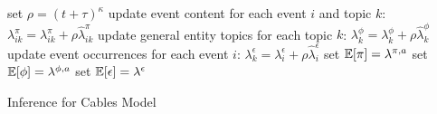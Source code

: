 \begin{algorithm}
{{%
			
	}
	set $\rho= (t +\tau)^\kappa$ \;
	update event content for each event $i$ and topic $k$: $\lambda^{\pi}_{ik} 
		= \lambda^{\pi}_{ik} + \rho \hat\lambda^{\pi}_{ik}$ \;
	update general entity topics for each topic $k$: $\lambda^{\phi}_{k} = 
		\lambda^{\phi}_{k} + \rho \hat\lambda^{\phi}_{k}$ \;
	update event occurrences for each event $i$: $\lambda^{\epsilon}_{k} = 
		\lambda^{\epsilon}_{i} + \rho \hat\lambda^{\epsilon}_{i}$ \;
	\BlankLine
	set $\mathbb{E}[\pi] = \lambda^{\pi,a}$ \;
	set $\mathbb{E}[\phi] = \lambda^{\phi,a}$ \;
	set $\mathbb{E}[\epsilon] = \lambda^{\epsilon}$ \;
}
\Return{$\E[\pi]$, $\E[\phi]$, $\E[\epsilon]$} \;
\caption{Inference for Cables Model}
\label{alg:cables}
\end{algorithm}





